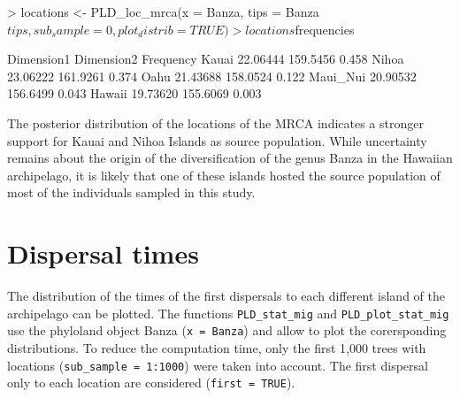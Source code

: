 \documentclass[a4paper]{article}
\begin{document}
\begin{Schunk}
\begin{Sinput}
> locations <- PLD_loc_mrca(x = Banza, tips = Banza$tips, sub_sample = 0, plot_distrib = TRUE)
> locations$frequencies
\end{Sinput}
\end{Schunk}

\begin{Soutput}
         Dimension1 Dimension2 Frequency
Kauai      22.06444   159.5456     0.458
Nihoa      23.06222   161.9261     0.374
Oahu       21.43688   158.0524     0.122
Maui_Nui   20.90532   156.6499     0.043
Hawaii     19.73620   155.6069     0.003

\end{Soutput}

The posterior distribution of the locations of the MRCA indicates a stronger support for Kauai and Nihoa Islands as source population.
While uncertainty remains about the origin of the diversification of the genus Banza in the Hawaiian archipelago, it is likely that one of these islands hosted the source population of most of the individuals sampled in this study.

\newpage
\section{Dispersal times}
\hspace{12pt}The distribution of the times of the first dispersals to each different island of the archipelago can be plotted.
The functions \texttt{PLD\_stat\_mig} and \texttt{PLD\_plot\_stat\_mig} use the phyloland object Banza (\texttt{x = Banza}) and allow to plot the corersponding distributions.
To reduce the computation time, only the first 1,000 trees with locations (\texttt{sub\_sample = 1:1000}) were taken into account.
The first dispersal only to each location are considered (\texttt{first = TRUE}).
\begin{Schunk}
\end{Schunk}
\end{document}
